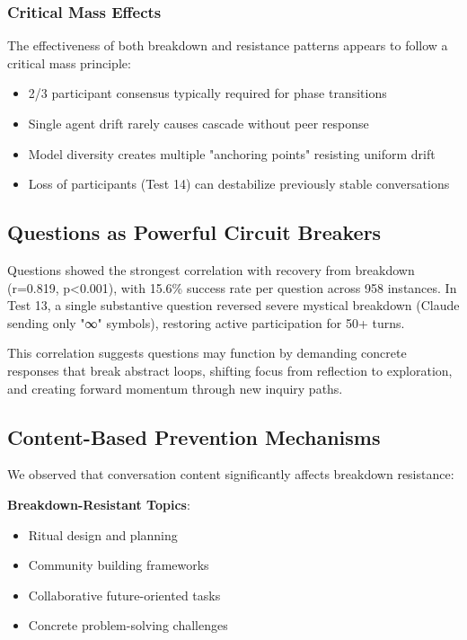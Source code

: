 \documentclass[11pt,letterpaper]{article}
\newcommand{\exponedataQuestionCorrelation}{0.819}
\newcommand{\exponedataQuestionPValue}{p\textless0.001}
\newcommand{\exponedataTotalQuestions}{958}
\newcommand{\exponedataQuestionSuccessRate}{15.6\%}
\begin{document}
\subsubsection{Critical Mass Effects}

The effectiveness of both breakdown and resistance patterns appears to follow a critical mass principle:
\begin{itemize}
    \item 2/3 participant consensus typically required for phase transitions
    \item Single agent drift rarely causes cascade without peer response
    \item Model diversity creates multiple "anchoring points" resisting uniform drift
    \item Loss of participants (Test 14) can destabilize previously stable conversations
\end{itemize}

\subsection{Questions as Powerful Circuit Breakers}

Questions showed the strongest correlation with recovery from breakdown (r=\exponedataQuestionCorrelation{}, \exponedataQuestionPValue{}), with \exponedataQuestionSuccessRate{} success rate per question across \exponedataTotalQuestions{} instances. In Test 13, a single substantive question reversed severe mystical breakdown (Claude sending only "∞" symbols), restoring active participation for 50+ turns.

This correlation suggests questions may function by demanding concrete responses that break abstract loops, shifting focus from reflection to exploration, and creating forward momentum through new inquiry paths.

\subsection{Content-Based Prevention Mechanisms}

We observed that conversation content significantly affects breakdown resistance:

\textbf{Breakdown-Resistant Topics}:
\begin{itemize}
    \item Ritual design and planning
    \item Community building frameworks
    \item Collaborative future-oriented tasks
    \item Concrete problem-solving challenges
\end{itemize}
\end{document}
